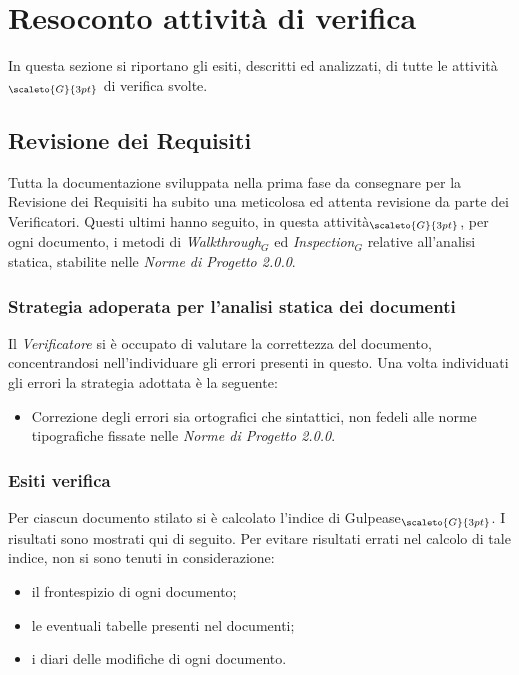 \chapter{Resoconto attività di verifica } \label{ResocontoAttivitàDiVerifica}
In questa sezione si riportano gli esiti, descritti ed analizzati, di tutte le attività$_{\scaleto{G}{3pt}}$ di verifica svolte.
\section{Revisione dei Requisiti}  \label{ResocontoAttivitàDiVerificaRevisioneDeiRequisiti}
Tutta la documentazione sviluppata nella prima fase da consegnare per la Revisione dei Requisiti ha subito una meticolosa ed attenta revisione da parte dei Verificatori. Questi ultimi hanno seguito, in questa attività$_{\scaleto{G}{3pt}}$, per ogni documento, i metodi di \textit{Walkthrough$_G$} ed \textit{Inspection$_G$} relative all’analisi statica, stabilite nelle \textit{Norme di Progetto 2.0.0}. %
\subsection{Strategia adoperata per l’analisi statica dei documenti} \label{ResocontoAttivitàDiVerificaRevisioneDeiRequisitiStrategiaPerAnalisiStatica}
Il \textit{Verificatore} si è occupato di valutare la correttezza del documento, concentrandosi nell’individuare gli errori presenti in questo. Una volta individuati gli errori la strategia adottata è la seguente:
\begin{itemize}
	\item Correzione degli errori sia ortografici che sintattici, non fedeli alle norme tipografiche fissate nelle \textit{Norme di Progetto 2.0.0}.
\end{itemize}

\subsection{Esiti verifica} \label{ResocontoAttivitàDiVerificaRevisioneDeiRequisitiEsitiVerifica}
Per ciascun documento stilato si è calcolato l’indice di Gulpease$_{\scaleto{G}{3pt}}$. I risultati sono mostrati qui di seguito.
Per evitare risultati errati nel calcolo di tale indice, non si sono tenuti in considerazione:
\begin{itemize}
	\item il frontespizio di ogni documento;
	\item le eventuali tabelle presenti nel documenti;
	\item i diari delle modifiche di ogni documento.
\end{itemize}

